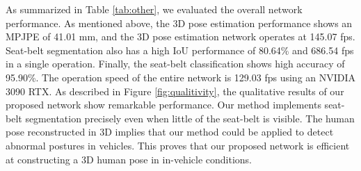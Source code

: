 \documentclass[letterpaper]{article} %
\begin{document}
As summarized in Table \ref{tab:other}, we evaluated the overall network performance. As mentioned above, the 3D pose estimation performance shows an MPJPE of 41.01 mm, and the 3D pose estimation network operates at 145.07 fps. Seat-belt segmentation also has a high IoU performance of 80.64\% and 686.54 fps in a single operation. Finally, the seat-belt classification shows high accuracy of 95.90\%. The operation speed of the entire network is 129.03 fps using an NVIDIA 3090 RTX. As described in Figure \ref{fig:qualitivity}, the qualitative results of our proposed network show remarkable performance. Our method implements seat-belt segmentation precisely even when little of the seat-belt is visible. The human pose reconstructed in 3D implies that our method could be applied to detect abnormal postures in vehicles. This proves that our proposed network is efficient at constructing a 3D human pose in in-vehicle conditions.
\end{document}
